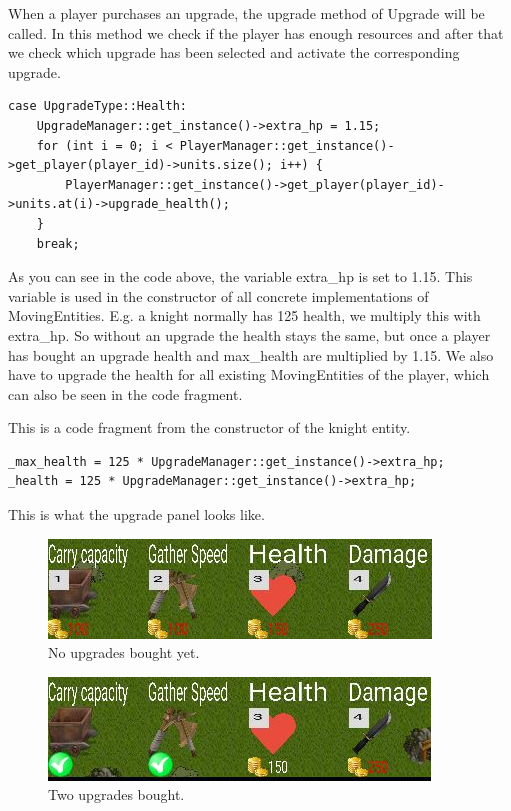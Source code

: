 When a player purchases an upgrade, the upgrade method of Upgrade will
be called. In this method we check if the player has enough resources and after
that we check which upgrade has been selected and activate the corresponding
upgrade. 

\begin{lstlisting} 
case UpgradeType::Health:
    UpgradeManager::get_instance()->extra_hp = 1.15; 
    for (int i = 0; i < PlayerManager::get_instance()->get_player(player_id)->units.size(); i++) {
        PlayerManager::get_instance()->get_player(player_id)->units.at(i)->upgrade_health();
    } 
    break; 
\end{lstlisting}

As you can see in the code above, the variable extra\_hp is set to 1.15. This
variable is used in the constructor of all concrete implementations of
MovingEntities. E.g. a knight normally has 125 health, we multiply this with
extra\_hp. So without an upgrade the health stays the same, but once a player
has bought an upgrade health and max\_health are multiplied by 1.15. We also
have to upgrade the health for all existing MovingEntities of the player, which
can also be seen in the code fragment.

This is a code fragment from the constructor of the knight entity.
\begin{lstlisting} 
_max_health = 125 * UpgradeManager::get_instance()->extra_hp; 
_health = 125 * UpgradeManager::get_instance()->extra_hp; 
\end{lstlisting}


This is what the upgrade panel looks like.

\begin{figure}[H] 
    \centering 
    \includegraphics{res/up.jpg} 
    \caption{No upgrades bought yet.} 
\end{figure}

\begin{figure}[H] 
    \centering 
    \includegraphics{res/up2.jpg} 
    \caption{Two upgrades bought.} 
\end{figure}

